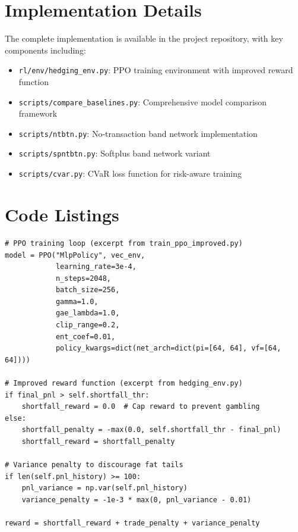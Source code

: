 \documentclass[11pt,letterpaper]{article}
\begin{document}
\section{Implementation Details}
The complete implementation is available in the project repository, with key components including:
\begin{itemize}
\item \texttt{rl/env/hedging\_env.py}: PPO training environment with improved reward function
\item \texttt{scripts/compare\_baselines.py}: Comprehensive model comparison framework
\item \texttt{scripts/ntbtn.py}: No-transaction band network implementation
\item \texttt{scripts/spntbtn.py}: Softplus band network variant
\item \texttt{scripts/cvar.py}: CVaR loss function for risk-aware training
\end{itemize}

\section{Code Listings}
\begin{verbatim}
# PPO training loop (excerpt from train_ppo_improved.py)
model = PPO("MlpPolicy", vec_env,
            learning_rate=3e-4,
            n_steps=2048,
            batch_size=256,
            gamma=1.0,
            gae_lambda=1.0,
            clip_range=0.2,
            ent_coef=0.01,
            policy_kwargs=dict(net_arch=dict(pi=[64, 64], vf=[64, 64])))

# Improved reward function (excerpt from hedging_env.py)
if final_pnl > self.shortfall_thr:
    shortfall_reward = 0.0  # Cap reward to prevent gambling
else:
    shortfall_penalty = -max(0.0, self.shortfall_thr - final_pnl)
    shortfall_reward = shortfall_penalty

# Variance penalty to discourage fat tails
if len(self.pnl_history) >= 100:
    pnl_variance = np.var(self.pnl_history)
    variance_penalty = -1e-3 * max(0, pnl_variance - 0.01)

reward = shortfall_reward + trade_penalty + variance_penalty
\end{verbatim}



\end{document}
